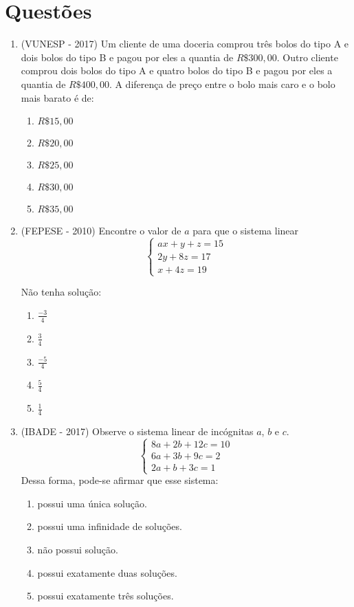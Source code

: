 \section{Questões}

\begin{enumerate}
 \item (VUNESP - 2017) Um cliente de uma doceria comprou três bolos do tipo A e dois bolos do tipo B e pagou por eles a quantia de $R\$ 300,00$. Outro cliente comprou dois bolos do tipo A e quatro bolos do tipo B e pagou por eles a quantia de $R\$ 400,00$. A diferença de preço entre o bolo mais caro e o bolo mais barato é de:
 \begin{enumerate}
 \item $R\$ 15,00$
 \item $R\$ 20,00$
 \item $R\$ 25,00$
 \item $R\$ 30,00$
 \item $R\$ 35,00$
 \end{enumerate}
 
 \item (FEPESE - 2010) Encontre o valor de $a$ para que o sistema linear
 \[ \begin{cases} 
 ax+y+z= 15 \\ 
 2y + 8z= 17 \\ 
 x + 4z= 19 
 \end{cases} \]
 
 Não tenha solução:
 \begin{enumerate}
\item $\frac{-3}{4}$
\item $\frac{3}{4}$
\item $\frac{-5}{4}$
\item $\frac{5}{4}$
\item $\frac{1}{4}$
\end{enumerate}
 
 \item (IBADE - 2017) Observe o sistema linear de incógnitas $a$, $b$ e $c$.
 \[ \begin{cases} 
 8a + 2b + 12c= 10 \\ 
 6a + 3b + 9c= 2 \\ 
 2a + b + 3c= 1 
 \end{cases} \]
 Dessa forma, pode-se afirmar que esse sistema:
\begin{enumerate}
\item possui uma única solução.
\item possui uma infinidade de soluções.
\item não possui solução.
\item possui exatamente duas soluções.
\item possui exatamente três soluções.
\end{enumerate}


\end{enumerate}
